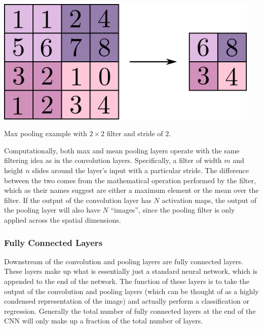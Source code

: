 \begin{marginfigure} 
\begin{center}
\includegraphics[width=0.95\textwidth]{tex/figs/ch12_figs/maxpool.png}
\caption{Max pooling example with $2 \times 2$ filter and stride of $2$.}
\label{fig:pooling}
\end{center}
\end{marginfigure}
Computationally, both max and mean pooling layers operate with the same filtering idea as in the convolution layers. Specifically, a filter of width $m$ and height $n$ slides around the layer's input with a particular stride. The difference between the two comes from the mathematical operation performed by the filter, which as their names suggest are either a maximum element or the mean over the filter. If the output of the convolution layer has $N$ activation maps, the output of the pooling layer will also have $N$ ``images'', since the pooling filter is only applied across the spatial dimensions.

\subsubsection{Fully Connected Layers}
Downstream of the convolution and pooling layers are fully connected layers. These layers make up what is essentially just a standard neural network, which is appended to the end of the network. The function of these layers is to take the output of the convolution and pooling layers (which can be thought of as a highly condensed representation of the image) and actually perform a classification or regression. Generally the total number of fully connected layers at the end of the CNN will only make up a fraction of the total number of layers.

